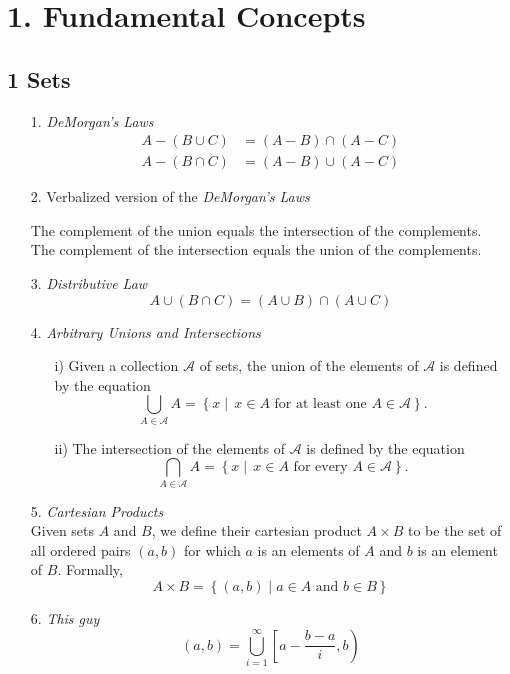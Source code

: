\section*{1. Fundamental Concepts}

\subsection*{1 Sets}

\begin{enumerate}
    \item[1.]\emph{DeMorgan's Laws}
            \begin{align*}
            A - \left(B \cup C\right) &= \left(A - B\right)\cap \left(A - C\right)\\
            A - \left(B \cap C\right) &= \left(A - B\right)\cup \left(A - C\right)
            \end{align*}
    \item[2.]Verbalized version of the \emph{DeMorgan's Laws}
            \begin{center}
                The complement of the union equals the intersection of the complements.\\
                The complement of the intersection equals the union of the complements.
            \end{center}
    \item[3.]\emph{Distributive Law}
            $$A \cup \left(B \cap C\right) = \left(A\cup B\right)\cap \left(A\cup C\right)$$
    \item[4.]\emph{ Arbitrary Unions and Intersections}
            \begin{enumerate}
                \item[i)] Given a collection $\mathcal{A}$ of sets, the union of the elements of $\mathcal{A}$ is defined by the equation
                $$\underset{A \in \mathcal{A}}{\bigcup} A = \left\{x \mid \, x\in A \text{ for at least one } A \in \mathcal{A}\right\}.$$
                \item[ii)] The intersection of the elements of $\mathcal{A}$ is defined by the equation 
                $$\underset{A \in \mathcal{A}}{\bigcap} A = \left\{x \mid \, x\in A \text{ for every } A \in \mathcal{A}\right\}.$$
            \end{enumerate}
    \item[5.] \emph{Cartesian Products}\\
            Given sets $A$ and $B$, we define their cartesian product $A \times B$ to be the set of all ordered pairs $(a, b)$ for which $a$ is an elements of $A$ and $b$ is an element of $B$. Formally,
            $$A \times B = \left\{(a, b) \mid a \in A \text{ and } b \in B\right\}$$
        \item[6.] \emph{This guy}
        $$(a, b) = \bigcup_{i=1}^{\infty} \left[a - \dfrac{b - a}{i}, b\right)$$
\end{enumerate}

